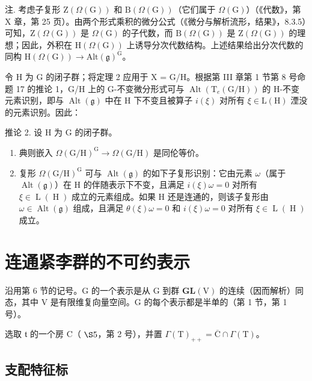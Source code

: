注. 考虑子复形 \(\mathrm{Z}(\varOmega(\mathrm{G}))\) 和 \(\mathrm{B}(\varOmega(\mathrm{G}))\)（它们属于 \(\varOmega(\mathrm{G})\)）（《代数》，第 X 章，第 25 页）。由两个形式乘积的微分公式（《微分与解析流形，结果》，8.3.5）可知，\(\mathrm{Z}(\varOmega(\mathrm{G}))\) 是 \(\varOmega(\mathrm{G})\) 的子代数，而 \(\mathrm{B}(\varOmega(\mathrm{G}))\) 是 \(\mathrm{Z}(\varOmega(\mathrm{G}))\) 的理想；因此，外积在 \(\mathrm{H}(\varOmega(\mathrm{G}))\) 上诱导分次代数结构。上述结果给出分次代数的同构 \(\mathrm{H}(\varOmega(\mathrm{G})) \to \mathrm{Alt}(\mathfrak{g})^{\mathrm{G}}\)。

令 H 为 G 的闭子群；将定理 2 应用于 X = G/H。根据第 III 章第 1 节第 8 号命题 17 的推论 1，G/H 上的 G-不变微分形式可与 \(\operatorname{Alt}(\mathrm{T}_{e}(\mathrm{G}/\mathrm{H}))\) 的 H-不变元素识别，即与 \(\operatorname{Alt}(\mathfrak{g})\) 中在 H 下不变且被算子 \(i(\xi)\) 对所有 \(\xi \in \mathrm{L}(\mathrm{H})\) 湮没的元素识别。因此：

推论 2. 设 \(\mathrm{H}\) 为 \(\mathrm{G}\) 的闭子群。

\begin{enumerate}
\def\labelenumi{\alph{enumi})}
\item
  典则嵌入 \(\Omega (\mathrm{G / H})^{\mathrm{G}}\to \Omega (\mathrm{G / H})\) 是同伦等价。
\item
  复形 \(\Omega(\mathrm{G}/\mathrm{H})^{\mathrm{G}}\) 可与 \(\operatorname{Alt}(\mathfrak{g})\) 的如下子复形识别：它由元素 \(\omega\)（属于 \(\operatorname{Alt}(\mathfrak{g})\)）在 H 的伴随表示下不变，且满足 \(i(\xi)\omega = 0\) 对所有 \(\xi \in \operatorname{L}(\operatorname{H})\) 成立的元素组成。如果 H 还是连通的，则该子复形由 \(\omega \in \operatorname{Alt}(\mathfrak{g})\) 组成，且满足 \(\theta(\xi)\omega = 0\) 和 \(i(\xi)\omega = 0\) 对所有 \(\xi \in \operatorname{L}(\operatorname{H})\) 成立。
\end{enumerate}

\section{连通紧李群的不可约表示}

沿用第 6 节的记号。G 的一个表示是从 G 到群 \(\mathbf{GL}(\mathrm{V})\) 的连续（因而解析）同态，其中 V 是有限维复向量空间。G 的每个表示都是半单的（第 1 节，第 1 号）。

选取 \(\mathfrak{t}\) 的一个房 C（ \(\S 5\)，第 2 号），并置 \(\Gamma(\mathrm{T})_{++} = \overline{\mathrm{C}} \cap \Gamma(\mathrm{T})\)。

\subsection{支配特征标}


